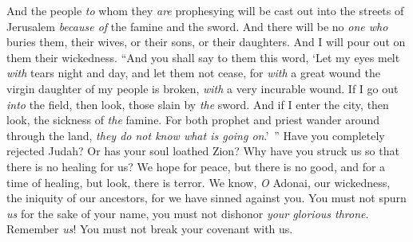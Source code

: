 \begin{biblechapter}
\verse And the people \textit{to} whom they \textit{are} prophesying will be cast out into the streets of Jerusalem \textit{because of} the famine and the sword. And there will be no \textit{one who} buries them, their wives, or their sons, or their daughters. And I will pour out on them their wickedness.
 “And you shall say to them this word,
\verse ‘Let my eyes melt \textit{with} tears night and day, 
and let them not cease, 
for \textit{with} a great wound the virgin daughter of my people is broken, 
\textit{with} a very incurable wound.
\verse If I go out \textit{into} the field, 
then look, those slain by \textit{the} sword. 
And if I enter the city, 
then look, the sickness of \textit{the} famine. 
For both prophet and priest wander around through the land, 
\textit{they do not know what is going on}.’ ”
\verse Have you completely rejected Judah? 
Or has your soul loathed Zion? 
Why have you struck us 
so that there is no healing for us? 
We hope for peace, but there is no good, 
and for a time of healing, but look, there is terror.
\verse We know, \textit{O} Adonai, our wickedness, 
the iniquity of our ancestors, 
for we have sinned against you.
\verse You must not spurn \textit{us} for the sake of your name, 
you must not dishonor \textit{your glorious throne}. 
Remember \textit{us}! 
You must not break your covenant with us.
\end{biblechapter}

